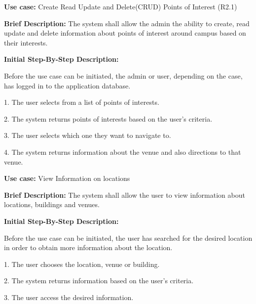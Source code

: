 \documentclass{article}
\begin{document}
\begin{flushleft}
    \textbf{Use case:} Create Read Update and Delete(CRUD) Points of Interest  (R2.1)
    \newline
    	
    \textbf{Brief Description:}
    \newline
    The system shall allow the admin the ability to create, read update and delete information about points of interest around campus based on their interests.
    \newline
    
    \textbf{Initial Step-By-Step Description:}
    
    Before the use case can be initiated, the admin or user, depending on the case, has logged in to the application database. 
	\newline    
	
1. The user selects from a list of points of interests.

2. The system returns points of interests based on the user's criteria.

3. The user selects which one they want to navigate to.

4. The system returns information about the venue and also directions to that venue.

\end{flushleft}

\begin{flushleft}
    \textbf{Use case:} View Information on locations
    \newline
    	
    \textbf{Brief Description:}
    \newline
    The system shall allow the user to view information about locations, buildings and venues.
    \newline
    
    \textbf{Initial Step-By-Step Description:}
    
    Before the use case can be initiated, the user has searched for the desired location in order to obtain more information about the location.
	\newline    
	
1. The user chooses the location, venue or building.

2. The system returns information based on the user's criteria. 

3. The user access the desired information.

\end{flushleft}
\end{document}
